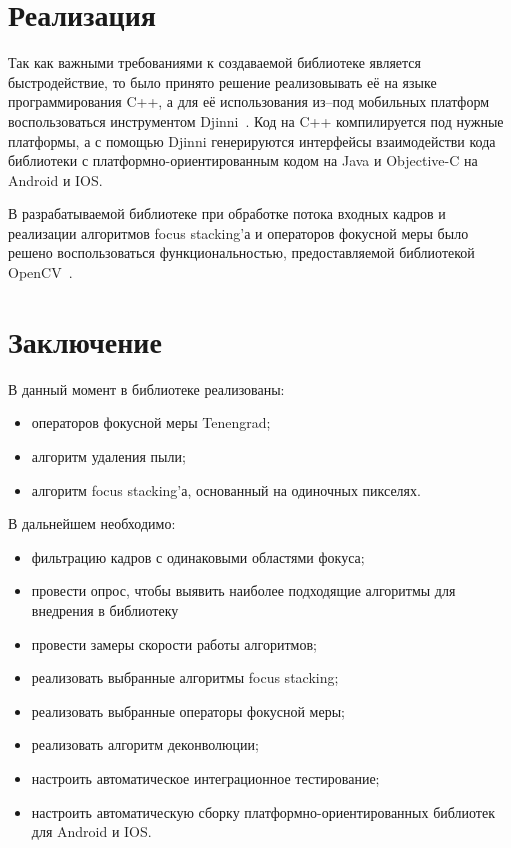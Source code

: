 \documentclass[14pt]{matmex-diploma-custom}
\begin{document}
\section{Реализация}

Так как важными требованиями к создаваемой библиотеке является быстродействие, то было принято решение реализовывать её на языке программирования C++, а для её использования из--под мобильных платформ воспользоваться инструментом Djinni~\cite{Djinni}. Код на C++ компилируется под нужные платформы, а с помощью Djinni генерируются интерфейсы взаимодействи кода библиотеки с платформно-ориентированным кодом на Java и Objective-C на Android и IOS. 
\par
В разрабатываемой библиотеке при обработке потока входных кадров и реализации алгоритмов focus stacking'а и операторов фокусной меры было решено воспользоваться функциональностью, предоставляемой библиотекой OpenCV~\cite{OpenCV}.

\section*{Заключение}
В данный момент в библиотеке реализованы:
\begin{itemize}
    \item операторов фокусной меры Tenengrad;
    \item алгоритм удаления пыли;
    \item алгоритм focus stacking'а, основанный на одиночных пикселях.
\end{itemize}

В дальнейшем необходимо:
\begin{itemize}
    \item фильтрацию кадров с одинаковыми областями фокуса;
    \item провести опрос, чтобы выявить наиболее подходящие алгоритмы для внедрения в библиотеку
    \item провести замеры скорости работы алгоритмов;
    \item реализовать выбранные алгоритмы focus stacking;
    \item реализовать выбранные операторы фокусной меры;
    \item реализовать алгоритм деконволюции;
    \item настроить автоматическое интеграционное тестирование;
    \item настроить автоматическую сборку платформно-ориентированных библиотек для Android и IOS.
\end{itemize}

\setmonofont[Mapping=tex-text]{CMU Typewriter Text}


\end{document}
